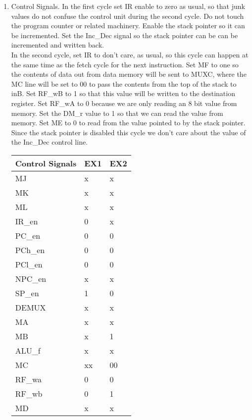 \documentclass[12pt,letterpaper]{article}
\begin{document}
\begin{enumerate}
\begin{enumerate}
        \item Control Signals. In the first cycle set IR enable to zero as usual, so that junk values do not confuse the control unit during the second cycle. Do not touch the program counter or related machinery. Enable the stack pointer so it can be incremented. Set the Inc\_Dec signal so the stack pointer can be can be incremented and written back.\\
        In the second cycle, set IR to don't care, as usual, so this cycle can happen at the same time as the fetch cycle for the next instruction. Set MF to one so the contents of data out from data memory will be sent to MUXC, where the MC line will be set to 00 to pass the contents from the top of the stack to inB. Set RF\_wB to 1 so that this value will be written to the destination register. Set RF\_wA to 0 because we are only reading an 8 bit value from memory. Set the DM\_r value to 1 so that we can read the value from memory. Set ME to 0 to read from the value pointed to by the stack pointer. Since the stack pointer is disabled this cycle we don't care about the value of the Inc\_Dec control line.\\
            \begin{tabular}{l l l}
                 Control Signals & EX1 & EX2 \\
                 \hline
                 MJ & x & x \\
                 MK & x & x \\
                 ML & x & x \\
                 IR\_en & 0 & x \\
                 PC\_en & 0 & 0 \\
                 PCh\_en & 0 & 0 \\
                 PCl\_en & 0 & 0 \\
                 NPC\_en & x & x \\
                 SP\_en & 1 & 0 \\
                 DEMUX & x & x \\
                 MA & x & x \\
                 MB & x & 1 \\
                 ALU\_f & x & x \\
                 MC & xx & 00 \\
                 RF\_wa & 0 & 0 \\
                 RF\_wb & 0 & 1 \\
                 MD & x & x \\

\end{tabular}
\end{enumerate}
\end{enumerate}
\end{document}
